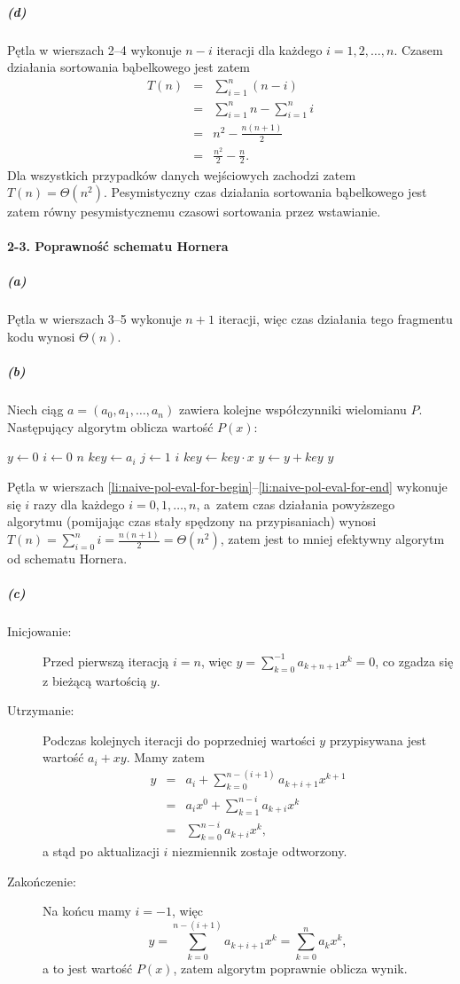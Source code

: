 \subparagraph{(d)}
Pętla  w wierszach 2--4 wykonuje $n-i$ iteracji dla każdego $i=1,2,\dots,n$. Czasem działania sortowania bąbelkowego jest zatem
\begin{eqnarray*}
	T(n) &=& \sum_{i=1}^n(n-i) \\
	&=& \sum_{i=1}^nn-\sum_{i=1}^ni \\
	&=& n^2-\frac{n(n+1)}{2} \\
	&=& \frac{n^2}{2}-\frac{n}{2}.
\end{eqnarray*}
Dla wszystkich przypadków danych wejściowych zachodzi zatem $T(n)=\Theta(n^2)$. Pesymistyczny czas działania sortowania bąbelkowego jest zatem równy pesymistycznemu czasowi sortowania przez wstawianie.

\paragraph{2-3. Poprawność schematu Hornera}

\subparagraph{(a)}
Pętla  w wierszach 3--5 wykonuje $n+1$ iteracji, więc czas działania tego fragmentu kodu wynosi $\Theta(n)$.

\subparagraph{(b)}
Niech ciąg $a=(a_0,a_1,\dots,a_n)$ zawiera kolejne współczynniki wielomianu $P$. Następujący algorytm oblicza wartość $P(x)$:
\begin{codebox}
\li $y\gets 0$
\li \For $i\gets 0$ \To $n$
\li     \Do
            $key\gets a_i$
\li         \For $j\gets 1$ \To $i$ \label{li:naive-pol-eval-for-begin}
\li             \Do
                    $key\gets key\cdot x$
                \End \label{li:naive-pol-eval-for-end}
\li         $y\gets y+key$
        \End
\li \Return $y$
\end{codebox}
Pętla  w wierszach \ref{li:naive-pol-eval-for-begin}--\ref{li:naive-pol-eval-for-end} wykonuje się $i$ razy dla każdego $i=0,1,\dots,n$, a~zatem czas działania powyższego algorytmu (pomijając czas stały spędzony na przypisaniach) wynosi $T(n)=\sum_{i=0}^ni=\frac{n(n+1)}{2}=\Theta(n^2)$, zatem jest to mniej efektywny algorytm od schematu Hornera.

\subparagraph{(c)}
\begin{description}
 \item[Inicjowanie:] Przed pierwszą iteracją $i=n$, więc $y=\sum_{k=0}^{-1}a_{k+n+1}x^k=0$, co zgadza się z bieżącą wartością $y$.
 \item[Utrzymanie:] Podczas kolejnych iteracji do poprzedniej wartości $y$ przypisywana jest wartość $a_i+xy$. Mamy zatem
 \begin{eqnarray*}
 	y &=& a_i+\sum_{k=0}^{n-(i+1)}a_{k+i+1}x^{k+1} \\
 	&=& a_ix^0+\sum_{k=1}^{n-i}a_{k+i}x^k \\
 	&=& \sum_{k=0}^{n-i}a_{k+i}x^k,
 \end{eqnarray*}
 a stąd po aktualizacji $i$ niezmiennik zostaje odtworzony.
 \item[Zakończenie:] Na końcu mamy $i=-1$, więc
 \[
 	y=\sum_{k=0}^{n-(i+1)}a_{k+i+1}x^k=\sum_{k=0}^na_kx^k,
 \]
 a to jest wartość $P(x)$, zatem algorytm poprawnie oblicza wynik.
\end{description}

